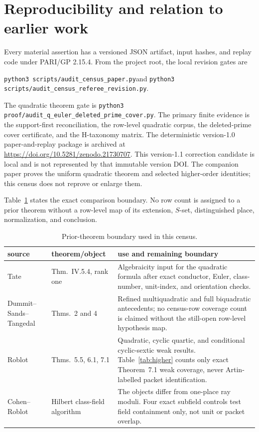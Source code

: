 \documentclass[11pt]{article}
\begin{document}
\section{Reproducibility and relation to earlier work}

Every material assertion has a versioned JSON artifact, input hashes,
and replay code under PARI/GP 2.15.4.  From the project root, the local
revision gates are
\begin{center}\small
\texttt{python3 scripts/audit\_census\_paper.py}\quad and\quad
\texttt{python3 scripts/audit\_census\_referee\_revision.py}.
\end{center}
The quadratic theorem gate is
\texttt{python3 proof/audit\_q\_euler\_deleted\_prime\_cover.py}.
The primary finite evidence is the support-first reconciliation, the
row-level quadratic corpus, the deleted-prime cover certificate, and
the H-taxonomy matrix.  The deterministic version-1.0 paper-and-replay
package is archived at \url{https://doi.org/10.5281/zenodo.21730707}.
This version-1.1 correction candidate is local and is not represented
by that immutable version DOI.  The companion paper proves the uniform
quadratic theorem and selected higher-order identities; this census
does not reprove or enlarge them.

Table~\ref{tab:prior} states the exact comparison boundary.  No row
count is assigned to a prior theorem without a row-level map of its
extension, $S$-set, distinguished place, normalization, and conclusion.

\begin{table}[ht]
\centering\small
\caption{Prior-theorem boundary used in this census.}\label{tab:prior}
\begin{tabular}{>{\raggedright\arraybackslash}p{2.5cm}
                >{\raggedright\arraybackslash}p{3.5cm}
                >{\raggedright\arraybackslash}p{6.6cm}}\toprule
source & theorem/object & use and remaining boundary\\\midrule
Tate \cite{Tate1984} & Thm.~IV.5.4, rank one & Algebraicity input for
the quadratic formula after exact conductor, Euler, class-number,
unit-index, and orientation checks.\\
Dummit--Sands--Tangedal \cite{DST2003} & Thms.~2 and 4 & Refined
multiquadratic and full biquadratic antecedents; no census-row coverage
count is claimed without the still-open row-level hypothesis map.\\
Roblot \cite{Roblot2013} & Thms.~5.5, 6.1, 7.1 & Quadratic, cyclic
quartic, and conditional cyclic-sextic weak results.
Table~\ref{tab:higher} counts only exact Theorem~7.1 weak coverage,
never Artin-labelled packet identification.\\
Cohen--Roblot \cite{CohenRoblot2000} & Hilbert class-field algorithm &
The objects differ from one-place ray moduli.  Four exact subfield
controls test field containment only, not unit or packet overlap.\\\bottomrule
\end{tabular}
\end{table}
\end{document}
